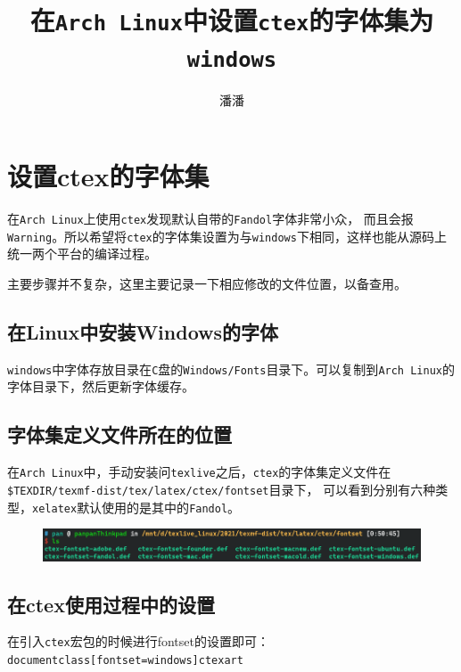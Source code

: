 \documentclass[fontset=windows]{ctexart}
\title{在\texttt{Arch Linux}中设置\texttt{ctex}的字体集为\texttt{windows}}
\author{潘潘}
\begin{document}
\maketitle

\section{设置ctex的字体集}

在\texttt{Arch Linux}上使用\texttt{ctex}发现默认自带的\texttt{Fandol}字体非常小众，
而且会报\texttt{Warning}。所以希望将\texttt{ctex}的字体集设置为与\texttt{windows}下相同，这样也能从源码上统一两个平台的编译过程。

主要步骤并不复杂，这里主要记录一下相应修改的文件位置，以备查用。

\subsection{在Linux中安装Windows的字体}

\texttt{windows}中字体存放目录在\texttt{C}盘的\texttt{Windows/Fonts}目录下。可以复制到\texttt{Arch Linux}的字体目录下，然后更新字体缓存。



\subsection{字体集定义文件所在的位置}

在\texttt{Arch Linux}中，手动安装问\texttt{texlive}之后，\texttt{ctex}的字体集定义文件在\texttt{\$TEXDIR/texmf-dist/tex/latex/ctex/fontset}目录下，
可以看到分别有六种类型，\texttt{xelatex}默认使用的是其中的\texttt{Fandol}。

\begin{figure}[ht]
\includegraphics[width=\textwidth]{ctex_fontsets}
\end{figure}

\subsection{在ctex使用过程中的设置}

在引入\texttt{ctex}宏包的时候进行fontset的设置即可：\texttt{\\documentclass[fontset=windows]{ctexart}}
\end{document}

